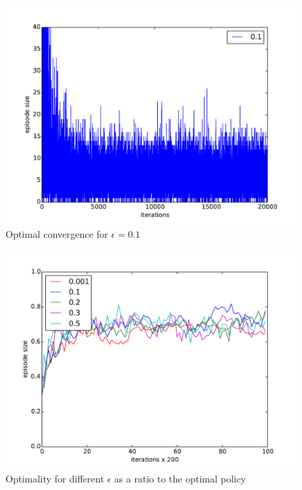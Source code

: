 \documentclass[paper=a4, fontsize=11pt]{scrartcl}
\numberwithin{equation}{section}		%
\numberwithin{figure}{section}			%
\numberwithin{table}{section}				%
\begin{document}
\begin{figure}[H] \centering
\includegraphics[scale=0.4]{epsilon0_1.pdf}
\caption{Optimal convergence for $\epsilon=0.1$} 
\label{figure:epsilon02}
\end{figure}

\begin{figure}[H] \centering
\includegraphics[scale=0.6]{epsilonOptimality.pdf}
\caption{Optimality for different $\epsilon$ as a ratio to the optimal policy} 
\label{figure:epsilonOpti}
\end{figure}
\end{document}
